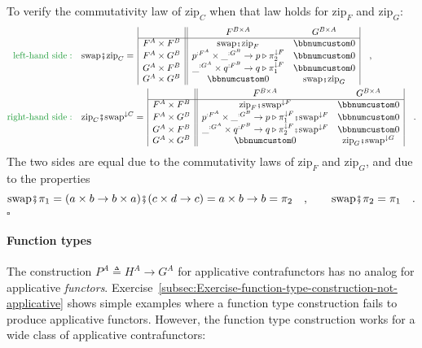 To verify the commutativity law of $\text{zip}_{C}$ when that law
holds for $\text{zip}_{F}$ and $\text{zip}_{G}$:
\begin{align*}
{\color{greenunder}\text{left-hand side}:}\quad & \text{swap}\bef\text{zip}_{C}=\,\begin{array}{|c||cc|}
 & F^{B\times A} & G^{B\times A}\\
\hline F^{A}\times F^{B} & \text{swap}\bef\text{zip}_{F} & \bbnum 0\\
F^{A}\times G^{B} & p^{:F^{A}}\times\_^{:G^{B}}\rightarrow p\triangleright\pi_{2}^{\downarrow F} & \bbnum 0\\
G^{A}\times F^{B} & \_^{:G^{A}}\times q^{:F^{B}}\rightarrow q\triangleright\pi_{1}^{\downarrow F} & \bbnum 0\\
G^{A}\times G^{B} & \bbnum 0 & \text{swap}\bef\text{zip}_{G}
\end{array}\quad,\\
{\color{greenunder}\text{right-hand side}:}\quad & \text{zip}_{C}\bef\text{swap}^{\downarrow C}=\,\begin{array}{|c||cc|}
 & F^{B\times A} & G^{B\times A}\\
\hline F^{A}\times F^{B} & \text{zip}_{F}\bef\text{swap}^{\downarrow F} & \bbnum 0\\
F^{A}\times G^{B} & p^{:F^{A}}\times\_^{:G^{B}}\rightarrow p\triangleright\pi_{1}^{\downarrow F}\bef\text{swap}^{\downarrow F} & \bbnum 0\\
G^{A}\times F^{B} & \_^{:G^{A}}\times q^{:F^{B}}\rightarrow q\triangleright\pi_{2}^{\downarrow F}\bef\text{swap}^{\downarrow F} & \bbnum 0\\
G^{A}\times G^{B} & \bbnum 0 & \text{zip}_{G}\bef\text{swap}^{\downarrow G}
\end{array}\quad.
\end{align*}
The two sides are equal due to the commutativity laws of $\text{zip}_{F}$
and $\text{zip}_{G}$, and due to the properties
\[
\text{swap}\bef\pi_{1}=(a\times b\rightarrow b\times a)\bef(c\times d\rightarrow c)=a\times b\rightarrow b=\pi_{2}\quad,\quad\quad\text{swap}\bef\pi_{2}=\pi_{1}\quad.
\]
$\square$

\paragraph{Function types}

The construction $P^{A}\triangleq H^{A}\rightarrow G^{A}$ for applicative
contrafunctors has no analog for applicative \emph{functors}. Exercise~\ref{subsec:Exercise-function-type-construction-not-applicative}
shows simple examples where a function type construction fails to
produce applicative functors. However, the function type construction
works for a wide class of applicative contrafunctors:

